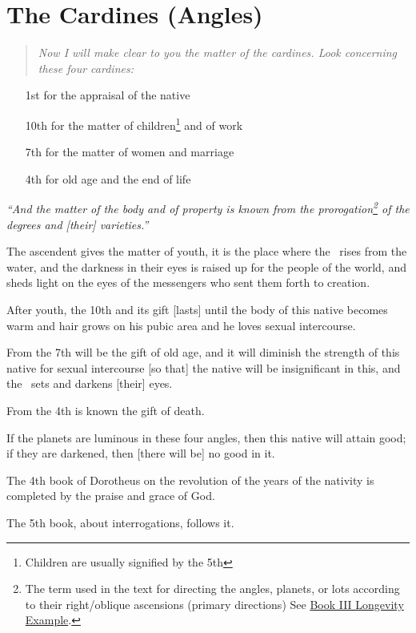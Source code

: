 \section{The Cardines (Angles)}
\begin{quote}
 \textsl{Now I will make clear to you the matter of the cardines. Look concerning these four cardines:}
\end{quote}

\begin{itemize}[topsep=0em,itemsep=0em]
\item[1st] for the appraisal of the native
\item[10th] for the matter of children\footnote{Children are usually signified by the 5th} and of work
\item[7th] for the matter of women and marriage
\item[4th] for old age and the end of life
\end{itemize}

\textsl{``And the matter of the body and of property is known from the prorogation\footnote{The term used in the text for directing the angles, planets, or lots according to their right/oblique ascensions (primary directions) See \hyperref[sec:longevity]{Book III Longevity Example}.} of the degrees and [their] varieties.''}

The  ascendent gives the matter of youth, it is the place where the \Sun\, rises from the water, and the darkness in their eyes is raised up for the people of the world, and sheds light on the eyes of the messengers who sent them forth to creation.

After  youth, the 10th and its gift [lasts] until the body of this native becomes warm and hair grows on his pubic area and he loves sexual intercourse.

From  the 7th will be the gift of old age, and it will diminish the strength of this native for sexual intercourse [so that] the native will be insignificant in this, and the \Sun\, sets and darkens [their] eyes.

From  the 4th is known the gift of death.

If  the planets are luminous in these four angles, then this native will attain good; if they are darkened, then [there will be] no good in it.

The 4th book of Dorotheus on the revolution of the years of the nativity is completed by the praise and grace of God.

The 5th book, about interrogations, follows it.

